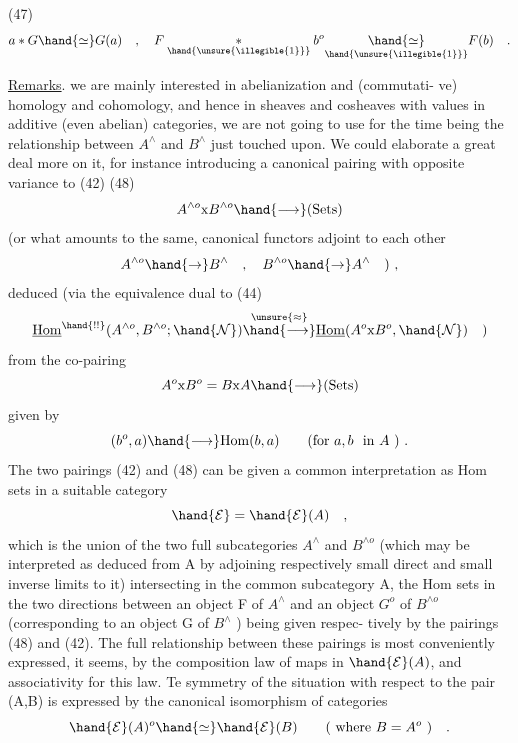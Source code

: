 
(47) \[ a * G \hand{\simeq} G(a) \quad , \quad F \underset{\hand{\unsure{\illegible{1}}}}{*} b^{o} \underset{\hand{\unsure{\illegible{1}}}}{\hand{\simeq}} F(b) \quad . \]

\uline{Remarks}.   we are mainly interested  in abelianization\xout{,} and  (commutati-%
ve) homology and cohomology,  and hence in  sheaves and
cosheaves with values in additive (even abelian) categories,  we are not
going to use for the time being the relationship between $A^{\wedge}$ and $B^{\wedge}$
just touched upon.  We could elaborate a great deal more on it,  for
instance introducing a canonical pairing  with opposite variance to (42)
(48) \[ A^{\wedge o} \mathrm{x} B^{\wedge o} \hand{\longrightarrow} (\mathrm{Sets}) \]
(or what amounts to the same,  canonical functors adjoint to each other
\[ A^{\wedge o} \hand{\to} B^{\wedge} \quad , \quad B^{\wedge o} \hand{\to} A^{\wedge} \quad ) \ , \]
deduced (via the  equivalence dual to (44)
\[ \underline{\mathrm{Hom}}^{\hand{!!}}(A^{\wedge o},B^{\wedge o};\hand{\mathcal{N}}) \overset{\unsure{\approx}}{\hand{\longrightarrow}} \underline{\mathrm{Hom}}(A^{o}\mathrm{x} B^{o},\hand{\mathcal{N}}) \quad ) \]
from the co-pairing
\[ A^{o} \mathrm{x} B^{o} = B \mathrm{x} A \hand{\longrightarrow} (\mathrm{Sets}) \]
given by
\[ (b^{o},a) \hand{\longrightarrow} \mathrm{Hom}(b,a) \qquad (\text{for } a,b \ \text{ in } A\ ) \ . \]
The two pairings (42) and (48) can be given a common interpretation as
Hom  sets in a suitable category
\[ \hand{\mathcal{E}} = \hand{\mathcal{E}}(A) \quad , \]
which is the union of the two full subcategories  $A^{\wedge}$ and $B^{\wedge o}$  (which may
be interpreted as deduced from A by adjoining respectively small direct
and small inverse limits to it) intersecting in the common subcategory A,
the Hom sets in the two directions between an object F of $A^{\wedge}$ and an object
$G^{o}$ of $B^{\wedge o}$ (corresponding to an object G of $B^{\wedge}$ )  being given  respec-%
 tively by the pairings (48) and (42).  The full relationship 
between these pairings is most conveniently expressed,  it seems,  by the
composition law of  maps in $\hand{\mathcal{E}}(A)$,  and associativity for this law.
Te symmetry of the situation with respect to the pair (A,B)  is expressed
by the canonical isomorphism of categories
\[ \hand{\mathcal{E}}(A)^{o} \hand{\simeq} \hand{\mathcal{E}}(B) \qquad (\ \text{where } B = A^{o}\ ) \quad . \]


